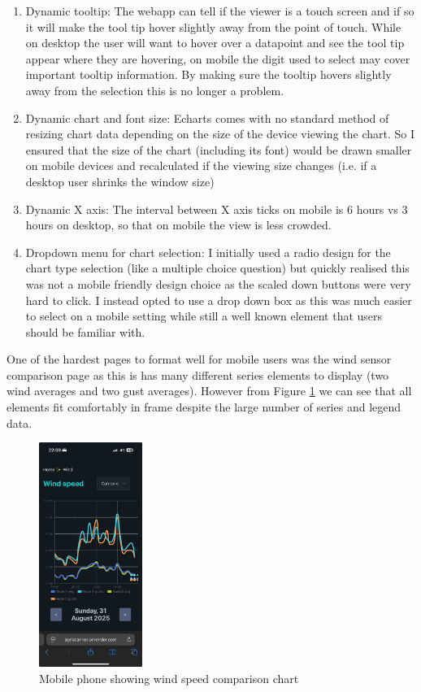 \begin{enumerate}
    \item Dynamic tooltip: The webapp can tell if the viewer is a touch screen
          and if so it will make the tool tip hover slightly away from the point
          of touch. While on desktop the user will want to hover over a
          datapoint and see the tool tip appear where they are hovering, on
          mobile the digit used to select may cover important tooltip
          information. By making sure the tooltip hovers slightly away from the
          selection this is no longer a problem.
    \item Dynamic chart and font size: Echarts comes with no standard method of
          resizing chart data depending on the size of the device viewing the
          chart. So I ensured that the size of the chart (including its font)
          would be drawn smaller on mobile devices and recalculated if the
          viewing size changes (i.e. if a desktop user shrinks the window size)
    \item Dynamic X axis: The interval between X axis ticks on mobile is 6 hours
        vs 3 hours on desktop, so that on mobile the view is less crowded.
    \item Dropdown menu for chart selection: I initially used a radio design for
        the chart type selection (like a multiple choice question) but quickly
        realised this was not a mobile friendly design choice as the scaled down
        buttons were very hard to click. I instead opted to use a drop down box
        as this was much easier to select on a mobile setting while still a well
        known element that users should be familiar with.
\end{enumerate}

One of the hardest pages to format well for mobile users was the wind sensor
comparison page as this is has many different series elements to display (two
wind averages and two gust averages). However from Figure \ref{fig:mobile-page}
we can see that all elements fit comfortably in frame despite the large number
of series and legend data.

\begin{figure}[H]
    \centering
    \includegraphics[width=0.3\textwidth]{contents/part-3/fig3/mobile-wind-speed-compare.jpeg}
    \caption{Mobile phone showing wind speed comparison chart}
    \label{fig:mobile-page}
\end{figure}


